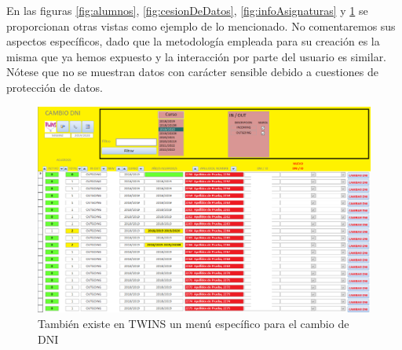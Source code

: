 En las figuras \ref{fig:alumnos}, \ref{fig:cesionDeDatos}, \ref{fig:infoAsignaturas} y \ref{fig:cambioDNI} se proporcionan otras vistas como ejemplo de lo mencionado. No comentaremos sus aspectos específicos, dado que la metodología empleada para su creación es la misma que ya hemos expuesto y la interacción por parte del usuario es similar. Nótese que no se muestran datos con carácter sensible debido a cuestiones de protección de datos.








\begin{figure}
	\includegraphics[width=\textwidth]{img/Capturas de TWINS/cambioDNI.png}
	\caption{También existe en TWINS un menú específico para el cambio de DNI}
	\label{fig:cambioDNI}
\end{figure}

%
%	

